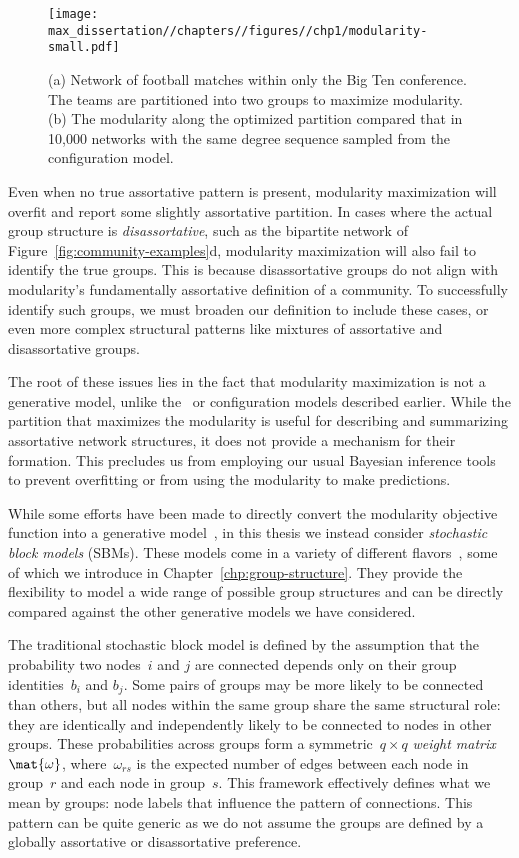 \begin{figure}
    \centering
    \texttt{[image: max\_dissertation//chapters//figures//chp1/modularity-small.pdf]}
    \caption{(a) Network of football matches within only the Big Ten conference. The teams are partitioned into two groups to maximize modularity. (b) The modularity along the optimized partition compared that in 10,000 networks with the same degree sequence sampled from the configuration model.}
    \label{fig:modularity-small}
\end{figure}

Even when no true assortative pattern is present, modularity maximization will overfit and report some slightly assortative partition. In cases where the actual group structure is \emph{disassortative}, such as the bipartite network of Figure~\ref{fig:community-examples}d, modularity maximization will also fail to identify the true groups. This is because disassortative groups do not align with modularity's fundamentally assortative definition of a community. To successfully identify such groups, we must broaden our definition to include these cases, or even more complex structural patterns like mixtures of assortative and disassortative groups. 

The root of these issues lies in the fact that modularity maximization is not a generative model, unlike the \ER~or configuration models described earlier. While the partition that maximizes the modularity is useful for describing and summarizing assortative network structures, it does not provide a mechanism for their formation. This precludes us from employing our usual Bayesian inference tools to prevent overfitting or from using the modularity to make predictions. 

While some efforts have been made to directly convert the modularity objective function into a generative model~\cite{PK23}, in this thesis we instead consider \emph{stochastic block models} (SBMs). These models come in a variety of different flavors~\cite{KN11a, Peixoto14a, YL2020}, some of which we introduce in Chapter~\ref{chp:group-structure}. They provide the flexibility to model a wide range of possible group structures and can be directly compared against the other generative models we have considered.

The traditional stochastic block model is defined by the assumption that the probability two nodes~$i$ and $j$ are connected depends only on their group identities~$b_i$ and $b_j$. Some pairs of groups may be more likely to be connected than others, but all nodes within the same group share the same structural role: they are identically and independently likely to be connected to nodes in other groups. These probabilities across groups form a symmetric~$q \times q$ \emph{weight matrix}~$\mat{\omega}$, where~$\omega_{rs}$ is the expected number of edges between each node in group~$r$ and each node in group~$s$. This framework effectively defines what we mean by groups: node labels that influence the pattern of connections. This pattern can be quite generic as we do not assume the groups are defined by a globally assortative or disassortative preference.

